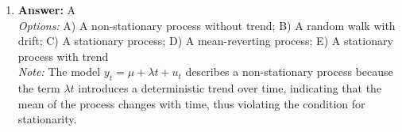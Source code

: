 \documentclass[12pt]{article}
\begin{document}
\begin{enumerate}[label=\arabic*.]
\\ \textit{Note:} Tariffs and quotas limit the supply of imported goods, which raises their prices and consequently increases the prices of domestic goods, leading to higher overall domestic prices.
\item \textbf{Answer:} A
\\ \textit{Options:} A) A non-stationary process without trend; B) A random walk with drift; C) A stationary process; D) A mean-reverting process; E) A stationary process with trend
\\ \textit{Note:} The model $y_t = \mu + \lambda t + u_t$ describes a non-stationary process because the term $\lambda t$ introduces a deterministic trend over time, indicating that the mean of the process changes with time, thus violating the condition for stationarity.
\end{enumerate}
\end{document}
